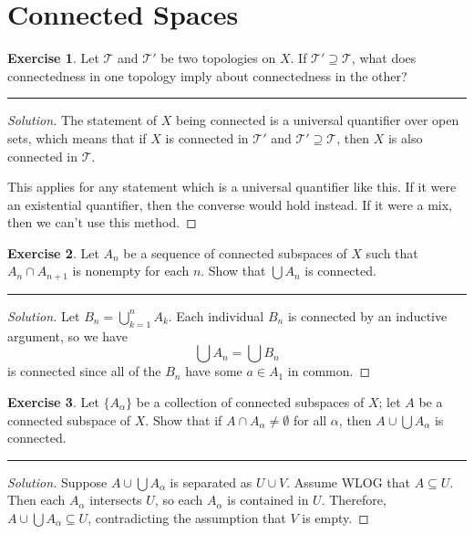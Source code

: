\documentclass{article}
\theoremstyle{definition}
\newtheorem{exercise}{Exercise}[section]
\begin{document}
\addtocounter{section}{22}
\section{Connected Spaces}

\begin{exercise}
  Let $\mathcal{T}$ and $\mathcal{T}'$ be two topologies on $X$. If $\mathcal{T}'\supseteq\mathcal{T}$, what does connectedness in one topology imply about connectedness in the other?
\end{exercise}
\hrule
\begin{proof}[Solution]
  The statement of $X$ being connected is a universal quantifier over open sets, which means that if $X$ is connected in $\mathcal{T}'$ and $\mathcal{T}'\supseteq\mathcal{T}$, then $X$ is also connected in $\mathcal{T}$.

  This applies for any statement which is a universal quantifier like this. If it were an existential quantifier, then the converse would hold instead. If it were a mix, then we can't use this method.
\end{proof}

\pagebreak

\begin{exercise}
  Let $A_n$ be a sequence of connected subspaces of $X$ such that $A_n\cap A_{n+1}$ is nonempty for each $n$. Show that $\bigcup A_n$ is connected.
\end{exercise}
\hrule
\begin{proof}[Solution]
  Let $B_n = \bigcup_{k=1}^{n} A_k$. Each individual $B_n$ is connected by an inductive argument, so we have
  $$\bigcup A_n = \bigcup B_n$$
  is connected since all of the $B_n$ have some $a\in A_1$ in common.
\end{proof}

\pagebreak

\begin{exercise}
  Let $\{A_\alpha\}$ be a collection of connected subspaces of $X$; let $A$ be a connected subspace of $X$. Show that if $A\cap A_\alpha\ne\emptyset$ for all $\alpha$, then $A\cup \bigcup A_\alpha$ is connected.
\end{exercise}
\hrule
\begin{proof}[Solution]
  Suppose $A\cup \bigcup A_\alpha$ is separated as $U\cup V$. Assume WLOG that $A\subseteq U$. Then each $A_\alpha$ intersects $U$, so each $A_\alpha$ is contained in $U$. Therefore, $A\cup\bigcup A_\alpha\subseteq U$, contradicting the assumption that $V$ is empty.
\end{proof}
\end{document}
